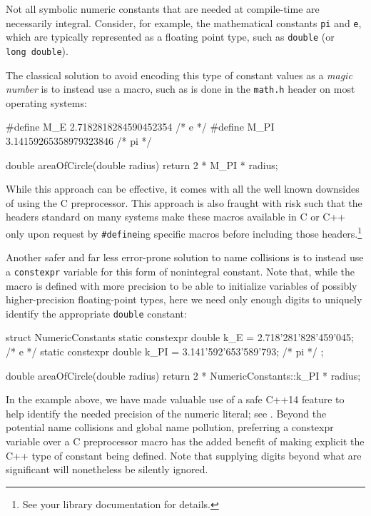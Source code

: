 Not all symbolic numeric constants that are needed at compile-time are
necessarily integral. Consider, for example, the mathematical constants
\lstinline!pi! and \lstinline!e!, which are typically represented as a
floating point type, such as \lstinline!double! (or
\lstinline!long!~\lstinline!double!).

The classical solution to avoid encoding this type of constant values as
a \emph{magic number} is to instead use a macro, such as is done in the
\lstinline!math.h! header on most operating systems:

\begin{emcppslisting}
#define M_E   2.7182818284590452354  /* e */
#define M_PI  3.14159265358979323846 /* pi */

double areaOfCircle(double radius)
{
    return 2 * M_PI * radius;
}
\end{emcppslisting}
    
\noindent While this approach can be effective, it comes with all the well known
downsides of using the C preprocessor. This approach is also fraught
with risk such that the headers standard on many systems make these
macros available in C or C++ only upon request by \lstinline!#define!ing
specific macros before including those headers.\footnote{See your library
documentation for details.}

Another safer and far less error-prone solution to name collisions is to
instead use a \lstinline!constexpr! variable for this form of nonintegral
constant. Note that, while the macro is defined with more precision to
be able to initialize variables of possibly higher-precision
floating-point types, here we need only enough digits to uniquely
identify the appropriate \lstinline!double! constant:

\begin{emcppslisting}[emcppsstandards={c++14}]
struct NumericConstants
{
    static constexpr double k_E  = 2.718'281'828'459'045;  /* e */
    static constexpr double k_PI = 3.141'592'653'589'793;  /* pi */
};

double areaOfCircle(double radius)
{
    return 2 * NumericConstants::k_PI * radius;
}
\end{emcppslisting}
    
\noindent In the example above, we have made valuable use of a safe C++14
feature to help identify the needed precision of the numeric literal;
see . Beyond the potential name
collisions and global name pollution, preferring a constexpr variable
over a C preprocessor macro has the added benefit of making explicit the
C++ type of constant being defined. Note that supplying digits beyond
what are significant will nonetheless be silently ignored.


